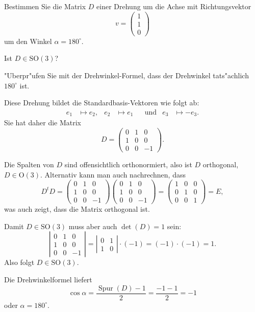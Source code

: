 Bestimmen Sie die Matrix $D$ einer Drehung um die Achse mit Richtungsvektor
\[
v=\begin{pmatrix}1\\1\\0\end{pmatrix}
\]
um den Winkel $\alpha=180^\circ$.
\begin{teilaufgaben}
\item Ist $D\in\text{SO}(3)$?
\item "Uberpr"ufen Sie mit der Drehwinkel-Formel, dass der Drehwinkel
tats"achlich $180^\circ$ ist.
\end{teilaufgaben}

\begin{loesung}
Diese Drehung bildet die Standardbasis-Vektoren wie folgt ab:
\[
\begin{aligned}
e_1&\mapsto e_2,
&
e_2&\mapsto e_1
&&\text{und}
&
e_3&\mapsto -e_3.
\end{aligned}
\]
Sie hat daher die Matrix
\[
D
=
\begin{pmatrix}
0&1& 0\\
1&0& 0\\
0&0&-1
\end{pmatrix}.
\]
\begin{teilaufgaben}
\item Die Spalten von $D$ sind offensichtlich orthonormiert, also ist $D$
orthogonal, $D\in\textrm{O}(3)$.
Alternativ kann man auch nachrechnen, dass
\[
D^tD
=
\begin{pmatrix}
0&1& 0\\
1&0& 0\\
0&0&-1
\end{pmatrix}
\begin{pmatrix}
0&1& 0\\
1&0& 0\\
0&0&-1
\end{pmatrix}
=
\begin{pmatrix}
1&0&0\\
0&1&0\\
0&0&1
\end{pmatrix}
=E,
\]
was auch zeigt, dass die Matrix orthogonal ist.

Damit $D\in\textrm{SO}(3)$ muss aber auch $\det(D)=1$ sein:
\[
\left|
\begin{matrix}
0&1& 0\\
1&0& 0\\
0&0&-1
\end{matrix}\right|
=
\left|\begin{matrix}0&1\\1&0\end{matrix}\right|\cdot (-1)
=(-1)\cdot(-1)=1.
\]
Also folgt $D\in\textrm{SO}(3)$.
\item
Die Drehwinkelformel liefert
\[
\cos\alpha = \frac{\operatorname{Spur}(D)-1}2=\frac{-1-1}2=-1
\]
oder $\alpha=180^\circ$.
\qedhere
\end{teilaufgaben}
\end{loesung}

